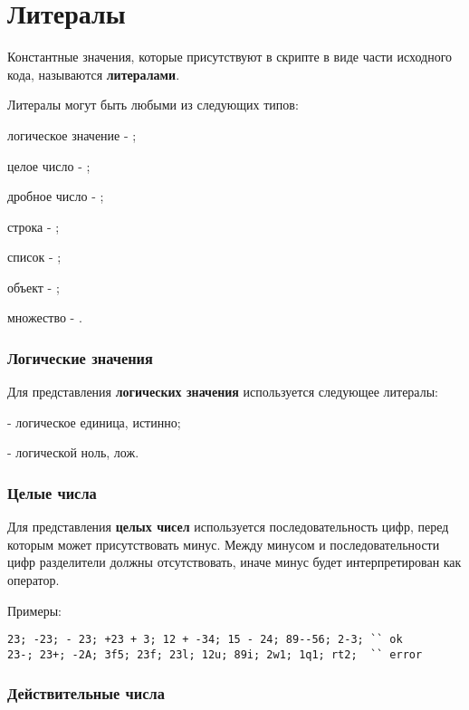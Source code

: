 \section{Литералы}

Константные значения, которые присутствуют в скрипте в виде части исходного кода, называются {\bf литералами}.

Литералы могут быть любыми из следующих типов:

\begin{icItems}
	\item
		логическое значение - \bool{};
	\item
		целое число - \integer{};
	\item
		дробное число - \double{};
	\item
		строка - \str{};
	\item
		список - \listtype{};
	\item
		объект - \object{};
	\item
		множество - \set{}.
\end{icItems}

\subsubsection{Логические значения}

Для представления {\bf логических значения} используется следующее литералы:
\begin{icItems}
	\item \true{} - логическое единица, истинно;
	\item \false{} - логической ноль, лож.
\end{icItems}

\subsubsection{Целые числа}

Для представления {\bf целых чисел} используется последовательность цифр, перед которым может присутствовать минус. Между минусом и последовательности цифр разделители должны отсутствовать, иначе минус будет интерпретирован как оператор.

\noindent Примеры:
\begin{lstlisting}[numbers=none]
23; -23; - 23; +23 + 3; 12 + -34; 15 - 24; 89--56; 2-3; `` ok
23-; 23+; -2А; 3f5; 23f; 23l; 12u; 89i; 2w1; 1q1; rt2;  `` error
\end{lstlisting}

\subsubsection{Действительные числа}

